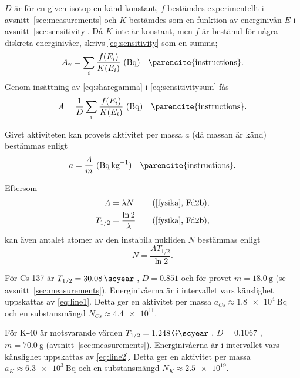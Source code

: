 $D$ är för en given isotop en känd konstant, $f$ bestämdes experimentellt
i avsnitt~\ref{sec:measurements} och $K$ bestämdes som en funktion av
energinivån $E$ i avsnitt~\ref{sec:sensitivity}. Då $K$ inte är konstant, men
$f$ är bestämd för några diskreta energinivåer, skrivs \eqref{eq:sensitivity}
som en summa;
%
\begin{equation}
    A_\gamma = \sum_i \frac{f(E_i)}{K(E_i)} \inlineunit{\becquerel} \quad \text{\parencite{instructions}} \label{eq:sensitivitysum}.
\end{equation}
%
Genom insättning av \eqref{eq:sharegamma} i \eqref{eq:sensitivitysum} fås
%
\begin{equation}
    A = \frac{1}{D} \sum_i \frac{f(E_i)}{K(E_i)} \inlineunit{\becquerel} \quad \text{\parencite{instructions}} \label{eq:activitysum}.
\end{equation}

Givet aktiviteten kan provets aktivitet per massa $a$ (då massan är känd)
bestämmas enligt
%
\begin{equation}
    a = \frac{A}{m} \inlineunit{\becquerel\per\kg} \quad \text{\parencite{instructions}} \label{eq:apm}.
\end{equation}

Eftersom
%
\begin{align}
    A       &= \lambda N             &\quad \fysika{Fd2b} \label{eq:activity}, \\
    T_{1/2} &= \frac{\ln 2}{\lambda} &\quad \fysika{Fd2b} \label{eq:halflife},
\end{align}
%
kan även antalet atomer av den instabila nukliden $N$ bestämmas enligt
%
\begin{equation}
    N = \frac{A T_{1/2}}{\ln 2} \label{eq:substance}.
\end{equation}

För Cs-137 är $T_{1/2} = \qty{30.08}{\scyear}$ ,
$D = \num{0.851}$ \parencite{instructions} och för provet $m = \qty{18.0}{\g}$
(se avsnitt~\ref{sec:measurements}). Energinivåerna är i intervallet vars
känslighet uppskattas av \eqref{eq:line1}. Detta ger en aktivitet per massa
$a_{Cs} \approx \qty{1.8e4}{\becquerel}$ och en substansmängd
$N_{Cs} \approx \num{4.4e11}$.

För K-40 är motsvarande värden $T_{1/2} = \qty{1.248}{\giga\scyear}$
, $D = \num{0.1067}$ \parencite{instructions}, $m = \qty{70.0}{\g}$
(avsnitt~\ref{sec:measurements}). Energinivåerna är i intervallet vars
känslighet uppskattas av \eqref{eq:line2}. Detta ger en aktivitet per massa
$a_K \approx \qty{6.3e3}{\becquerel}$ och en substansmängd
$N_K \approx \num{2.5e19}$.

